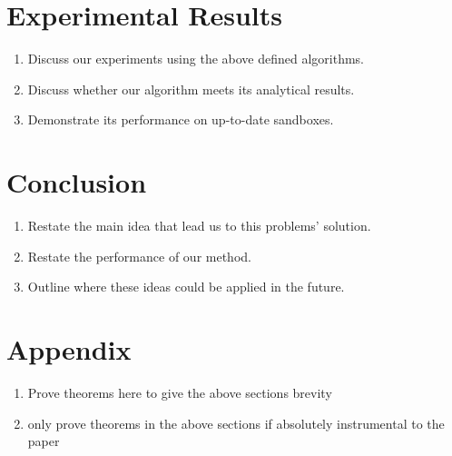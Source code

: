 \documentclass[11pt]{article}
\begin{document}
\section{Experimental Results}
\begin{enumerate}
	\item Discuss our experiments using the above defined algorithms.
	\item Discuss whether our algorithm meets its analytical results.
	\item Demonstrate its performance on up-to-date sandboxes.
\end{enumerate}

\section{Conclusion}
\begin{enumerate}
	\item Restate the main idea that lead us to this problems' solution.
	\item Restate the performance of our method.
	\item Outline where these ideas could be applied in the future.
\end{enumerate}




\section{Appendix}
\begin{enumerate}
	\item Prove theorems here to give the above sections brevity
	\item only prove theorems in the above sections if absolutely instrumental
	      to the paper
\end{enumerate}
\end{document}
